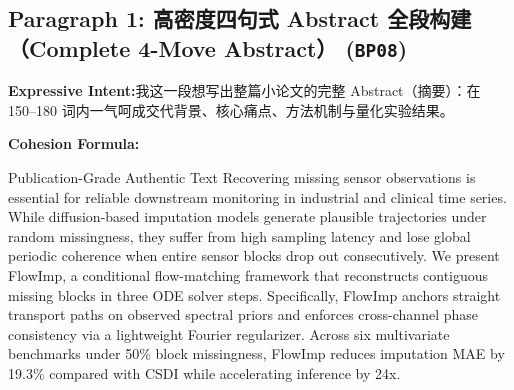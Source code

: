 \subsection*{Paragraph 1: 高密度四句式 Abstract 全段构建（Complete 4-Move Abstract） (\texttt{BP08})}
\noindent\textbf{Expressive Intent:}\enspace 我这一段想写出整篇小论文的完整 Abstract（摘要）：在 150--180 词内一气呵成交代背景、核心痛点、方法机制与量化实验结果。\par
\noindent\textbf{Cohesion Formula:}\par\vspace{4pt}
\begin{ExampleBox}{Publication-Grade Authentic Text}
Recovering missing sensor observations is essential for reliable downstream monitoring in industrial and clinical time series. While diffusion-based imputation models generate plausible trajectories under random missingness, they suffer from high sampling latency and lose global periodic coherence when entire sensor blocks drop out consecutively. We present FlowImp, a conditional flow-matching framework that reconstructs contiguous missing blocks in three ODE solver steps. Specifically, FlowImp anchors straight transport paths on observed spectral priors and enforces cross-channel phase consistency via a lightweight Fourier regularizer. Across six multivariate benchmarks under 50\% block missingness, FlowImp reduces imputation MAE by 19.3\% compared with CSDI while accelerating inference by 24x.
\end{ExampleBox}

